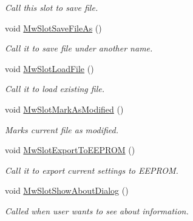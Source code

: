 \begin{DoxyCompactItemize}
\begin{DoxyCompactList}\small\item\em Call this slot to save file. \end{DoxyCompactList}\item 
\mbox{\label{class_main_window_aaadd1a2cd4aec05d23e934a26ee3dbc6}} 
void \hyperlink{class_main_window_aaadd1a2cd4aec05d23e934a26ee3dbc6}{Mw\+Slot\+Save\+File\+As} ()
\begin{DoxyCompactList}\small\item\em Call it to save file under another name. \end{DoxyCompactList}\item 
\mbox{\label{class_main_window_a1a8c873ce09b86ae625f08fc5fdd0552}} 
void \hyperlink{class_main_window_a1a8c873ce09b86ae625f08fc5fdd0552}{Mw\+Slot\+Load\+File} ()
\begin{DoxyCompactList}\small\item\em Call it to load existing file. \end{DoxyCompactList}\item 
\mbox{\label{class_main_window_ad7c825f88ddd5993b000a5dddc145bd3}} 
void \hyperlink{class_main_window_ad7c825f88ddd5993b000a5dddc145bd3}{Mw\+Slot\+Mark\+As\+Modified} ()
\begin{DoxyCompactList}\small\item\em Marks current file as modified. \end{DoxyCompactList}\item 
\mbox{\label{class_main_window_aacd70f10f37e4a196332059c330d7870}} 
void \hyperlink{class_main_window_aacd70f10f37e4a196332059c330d7870}{Mw\+Slot\+Export\+To\+E\+E\+P\+R\+OM} ()
\begin{DoxyCompactList}\small\item\em Call it to export current settings to E\+E\+P\+R\+OM. \end{DoxyCompactList}\item 
\mbox{\label{class_main_window_a8d2271688fa08105bc522e01c7cae563}} 
void \hyperlink{class_main_window_a8d2271688fa08105bc522e01c7cae563}{Mw\+Slot\+Show\+About\+Dialog} ()
\begin{DoxyCompactList}\small\item\em Called when user wants to see about information. \end{DoxyCompactList}\end{DoxyCompactItemize}

